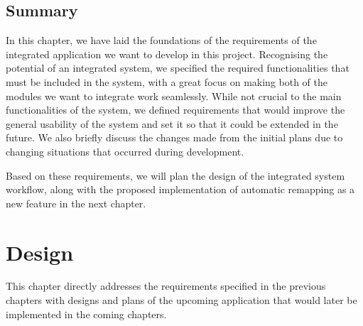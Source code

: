 \documentclass{l4proj}
\begin{document}

\section{Summary}
In this chapter, we have laid the foundations of the requirements of the integrated application we want to develop in this project. Recognising the potential of an integrated system, we specified the required functionalities that must be included in the system, with a great focus on making both of the modules we want to integrate work seamlessly. While not crucial to the main functionalities of the system, we defined requirements that would improve the general usability of the system and set it so that it could be extended in the future. We also briefly discuss the changes made from the initial plans due to changing situations that occurred during development.

Based on these requirements, we will plan the design of the integrated system workflow, along with the proposed implementation of automatic remapping as a new feature in the next chapter.


\chapter{Design}
\label{sec:design}
This chapter directly addresses the requirements specified in the previous chapters with designs and plans of the upcoming application that would later be implemented in the coming chapters.
\end{document}
